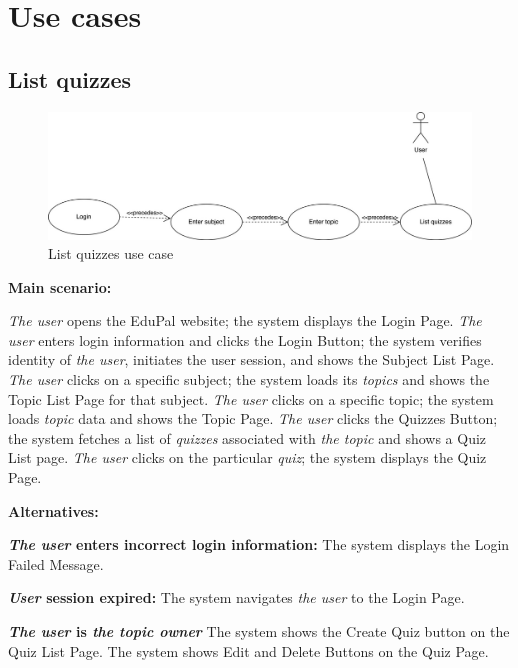 \documentclass[
    english, %
]{VUMIFPSkursinis}
\begin{document}
\section{Use cases}

\subsection{List quizzes}

\begin{figure}[ht]
    \centering
    \includegraphics[width=\textwidth]{../lab3diags/list.drawio Large.jpeg}
    \caption{List quizzes use case}
    \label{list-quizzes}
\end{figure}

\noindent\textbf{\fontsize{13}{15}\selectfont Main scenario:}

\textit{The user} opens the EduPal website; the system displays the Login Page. \textit{The user} enters login information and clicks the Login Button; the system verifies identity of \textit{the user}, initiates the user session, and shows the Subject List Page. \textit{The user} clicks on a specific subject; the system loads its \textit{topics} and shows the Topic List Page for that subject. \textit{The user} clicks on a specific topic; the system loads \textit{topic} data and shows the Topic Page. \textit{The user} clicks the Quizzes Button; the system fetches a list of \textit{quizzes} associated with \textit{the topic} and shows a Quiz List page. \textit{The user} clicks on the particular \textit{quiz}; the system displays the Quiz Page.

\noindent\textbf{\fontsize{13}{15}\selectfont Alternatives:}

\textbf{\textit{The user} enters incorrect login information:} The system displays the Login Failed Message.

\textbf{\textit{User} session expired:} The system navigates \textit{the user} to the Login Page.

\textbf{\textit{The user} is \textit{the topic owner}} The system shows the Create Quiz button on the Quiz List Page. The system shows Edit and Delete Buttons on the Quiz Page.
\end{document}
